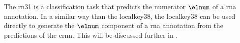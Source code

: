 
The \gls{rn31} is a classification task that predicts the
numerator $\elnum$ of a \gls{rna} annotation. In a similar
way than the \gls{localkey38}, the \gls{localkey38} can be
used directly to generate the $\elnum$ component of a
\gls{rna} annotation from the predictions of the \gls{crnn}.
This will be discussed further in .


